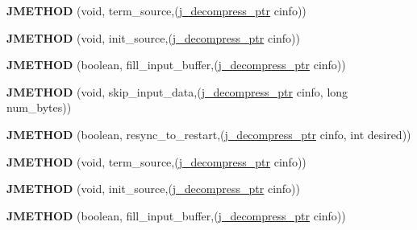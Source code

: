 \begin{DoxyCompactItemize}
\mbox{\label{structjpeg__source__mgr_a6c0683ce1166b9ee659b2d3aa1efb1c2}} 
{\bfseries J\+M\+E\+T\+H\+OD} (void, term\+\_\+source,(\hyperlink{structjpeg__decompress__struct}{j\+\_\+decompress\+\_\+ptr} cinfo))
\item 
\mbox{\label{structjpeg__source__mgr_af8fda02c19c9dc4e505daabb77c3ad81}} 
{\bfseries J\+M\+E\+T\+H\+OD} (void, init\+\_\+source,(\hyperlink{structjpeg__decompress__struct}{j\+\_\+decompress\+\_\+ptr} cinfo))
\item 
\mbox{\label{structjpeg__source__mgr_ab4a579b1f50108e2de73c7c0c1bbb9fd}} 
{\bfseries J\+M\+E\+T\+H\+OD} (boolean, fill\+\_\+input\+\_\+buffer,(\hyperlink{structjpeg__decompress__struct}{j\+\_\+decompress\+\_\+ptr} cinfo))
\item 
\mbox{\label{structjpeg__source__mgr_a3e29df8ddadb0c15e54b69b5a7a10305}} 
{\bfseries J\+M\+E\+T\+H\+OD} (void, skip\+\_\+input\+\_\+data,(\hyperlink{structjpeg__decompress__struct}{j\+\_\+decompress\+\_\+ptr} cinfo, long num\+\_\+bytes))
\item 
\mbox{\label{structjpeg__source__mgr_a60a35ccd1fb8d954f34c0cdbf29ac010}} 
{\bfseries J\+M\+E\+T\+H\+OD} (boolean, resync\+\_\+to\+\_\+restart,(\hyperlink{structjpeg__decompress__struct}{j\+\_\+decompress\+\_\+ptr} cinfo, int desired))
\item 
\mbox{\label{structjpeg__source__mgr_a6c0683ce1166b9ee659b2d3aa1efb1c2}} 
{\bfseries J\+M\+E\+T\+H\+OD} (void, term\+\_\+source,(\hyperlink{structjpeg__decompress__struct}{j\+\_\+decompress\+\_\+ptr} cinfo))
\item 
\mbox{\label{structjpeg__source__mgr_af8fda02c19c9dc4e505daabb77c3ad81}} 
{\bfseries J\+M\+E\+T\+H\+OD} (void, init\+\_\+source,(\hyperlink{structjpeg__decompress__struct}{j\+\_\+decompress\+\_\+ptr} cinfo))
\item 
\mbox{\label{structjpeg__source__mgr_ab4a579b1f50108e2de73c7c0c1bbb9fd}} 
{\bfseries J\+M\+E\+T\+H\+OD} (boolean, fill\+\_\+input\+\_\+buffer,(\hyperlink{structjpeg__decompress__struct}{j\+\_\+decompress\+\_\+ptr} cinfo))

\end{DoxyCompactItemize}
